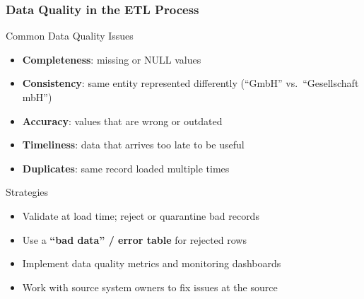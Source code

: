 \begin{frame}
  \frametitle{Data Quality in the ETL Process}

  \begin{block}{Common Data Quality Issues}
    \begin{itemize}
      \item \textbf{Completeness}: missing or NULL values
      \item \textbf{Consistency}: same entity represented differently
        (``GmbH'' vs.\ ``Gesellschaft mbH'')
      \item \textbf{Accuracy}: values that are wrong or outdated
      \item \textbf{Timeliness}: data that arrives too late to be useful
      \item \textbf{Duplicates}: same record loaded multiple times
    \end{itemize}
  \end{block}

  \begin{block}{Strategies}
    \begin{itemize}
      \item Validate at load time; reject or quarantine bad records
      \item Use a \textbf{``bad data'' / error table} for rejected rows
      \item Implement data quality metrics and monitoring dashboards
      \item Work with source system owners to fix issues at the source
    \end{itemize}
  \end{block}

\end{frame}

